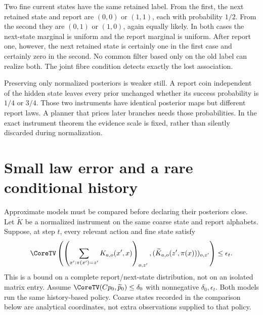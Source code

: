 \begin{Corecounterexample}\label{Core:ce:joint-marginals}
Two fine current states have the same retained label. From the first, the next retained state and report are $(0,0)$ or $(1,1)$, each with probability $1/2$. From the second they are $(0,1)$ or $(1,0)$, again equally likely. In both cases the next-state marginal is uniform and the report marginal is uniform. After report one, however, the next retained state is certainly one in the first case and certainly zero in the second. No common filter based only on the old label can realize both. The joint fibre condition detects exactly the lost association.
\end{Corecounterexample}

Preserving only normalized posteriors is weaker still. A report coin independent of the hidden state leaves every prior unchanged whether its success probability is $1/4$ or $3/4$. Those two instruments have identical posterior maps but different report laws. A planner that prices later branches needs those probabilities. In the exact instrument theorem the evidence scale is fixed, rather than silently discarded during normalization.

\section{Small law error and a rare conditional history}
Approximate models must be compared before declaring their posteriors close. Let $\widetilde K$ be a normalized instrument on the same coarse state and report alphabets. Suppose, at step $t$, every relevant action and fine state satisfy
\[
 \CoreTV\left(\left(\sum_{x':\pi(x')=z'}K_{a,o}(x',x)\right)_{o,z'},
             (\widetilde K_{a,o}(z',\pi(x)))_{o,z'}\right)\le\epsilon_t.
\]
This is a bound on a complete report/next-state distribution, not on an isolated matrix entry. Assume $\CoreTV(Cp_0,\widetilde p_0)\le\delta_0$ with nonnegative $\delta_0,\epsilon_t$. Both models run the same history-based policy. Coarse states recorded in the comparison below are analytical coordinates, not extra observations supplied to that policy.

